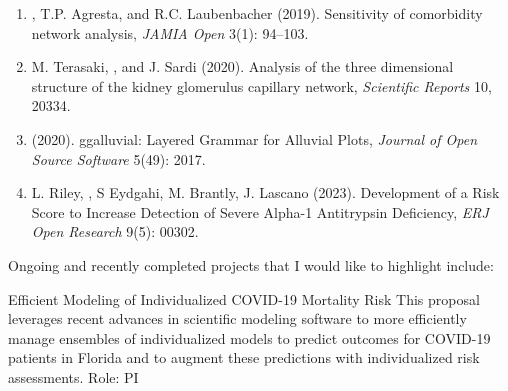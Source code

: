 \documentclass{nihbiosketch}
\begin{document}
\begin{statement}
\begin{enumerate}

\item {}, T.P. Agresta, and R.C. Laubenbacher (2019). Sensitivity of comorbidity network analysis, \emph{JAMIA Open} 3(1): 94--103.
\item M. Terasaki, , and J. Sardi (2020). Analysis of the three dimensional structure of the kidney glomerulus capillary network, \emph{Scientific Reports} 10, 20334.
\item {} (2020). ggalluvial: Layered Grammar for Alluvial Plots, \emph{Journal of Open Source Software} 5(49): 2017.
\item L. Riley, , S Eydgahi, M. Brantly, J. Lascano (2023). Development of a Risk Score to Increase Detection of Severe Alpha-1 Antitrypsin Deficiency, \emph{ERJ Open Research} 9(5): 00302.

\end{enumerate}

\noindent
Ongoing and recently completed projects that I would like to highlight include:

{Efficient Modeling of Individualized COVID-19 Mortality Risk}
{This proposal leverages recent advances in scientific modeling software to more efficiently manage ensembles of individualized models to predict outcomes for COVID-19 patients in Florida and to augment these predictions with individualized risk assessments.}
{Role: PI}

\end{statement}


\end{document}
